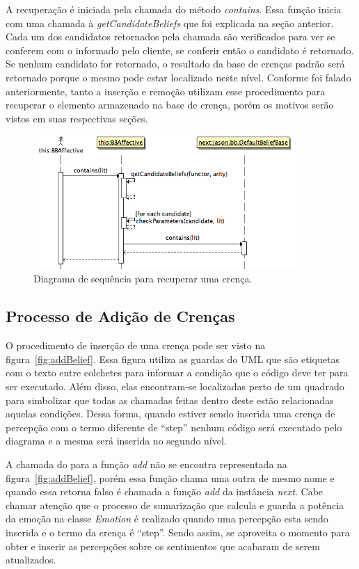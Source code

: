 A recuperação é iniciada pela chamada do método \emph{contains}. Essa função
inicia com uma chamada à \emph{getCandidateBeliefs} que foi explicada na seção anterior.
Cada um dos candidatos retornados pela chamada são verificados para ver se
conferem com o informado pelo cliente, se conferir então o candidato é
retornado. Se nenhum candidato for retornado, o resultado da base de crenças
padrão será retornado porque o mesmo pode estar localizado neste nível.
Conforme foi falado anteriormente, tanto a inserção e remoção utilizam esse
procedimento para recuperar o elemento armazenado na base de crença, porém os
motivos serão vistos em suas respectivas seções.

\begin{figure}
  \centering
  \includegraphics[width=100mm]{figuras/sd-contains.png}
  \caption{Diagrama de sequência para recuperar uma crença.}
  \label{fig:recover}
\end{figure}

\subsection{Processo de Adição de Crenças}

O procedimento de inserção de uma crença pode ser visto na
figura~\ref{fig:addBelief}. Essa figura utiliza as guardas do UML que são
etiquetas com o texto entre colchetes para informar a condição que o código
deve ter para ser executado. Além disso, elas encontram-se localizadas perto de
um quadrado para simbolizar que todas as chamadas feitas dentro deste estão
relacionadas aquelas condições. Dessa forma, quando estiver sendo inserida uma
crença de percepção com o termo diferente de ``step'' nenhum código será
executado pelo diagrama e a mesma será inserida no segundo nível.

A chamada do \jason para a função \emph{add} não se encontra representada na
figura~\ref{fig:addBelief}, porém essa função chama uma outra de mesmo nome e
quando essa retorna falso é chamada a função \emph{add} da instância
\emph{next}. Cabe chamar atenção que o processo de sumarização que calcula e
guarda a potência da emoção na classe \emph{Emotion} é realizado quando uma
percepção esta sendo inserida e o termo da crença é ``step''. Sendo assim, se
aproveita o momento para obter e inserir as percepções sobre os sentimentos
que acabaram de serem atualizados.

